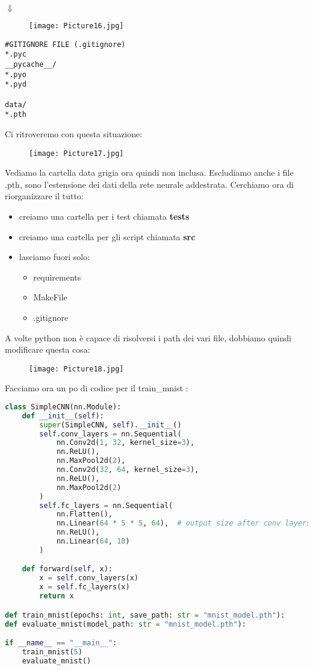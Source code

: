 \documentclass[a4paper,12pt]{article}
\begin{document}
\begin{center}
    $\Downarrow$
\end{center}
\begin{figure}[H]
    \centering
    \texttt{[image: Picture16.jpg]}
    \label{etichetta38}
\end{figure}
\begin{lstlisting}
#GITIGNORE FILE (.gitignore)
*.pyc
__pycache__/
*.pyo 
*.pyd 

data/ 
*.pth 
\end{lstlisting}
Ci ritroveremo con questa situazione: 
\begin{figure}[H]
    \centering
    \texttt{[image: Picture17.jpg]}
    \label{etichetta39}
\end{figure}
\noindent Vediamo la cartella data grigia ora quindi non inclusa. Escludiamo anche i file .pth, sono l'estensione dei dati della rete neurale addestrata. 
\vspace{2em}
Cerchiamo ora di riorganizzare il tutto:
\begin{itemize}
    \item creiamo una cartella per i test chiamata \textbf{tests}
    \item creiamo una cartella per gli script chiamata \textbf{src}
    \item lasciamo fuori solo:
    \begin{itemize}
        \item requirements
        \item MakeFile
        \item .gitignore
    \end{itemize}
\end{itemize}
A volte python non è capace di risolversi i path dei vari file, dobbiamo quindi modificare questa cosa:
\begin{figure}[H]
    \centering
    \texttt{[image: Picture18.jpg]}
    \label{etichetta40}
\end{figure}
\noindent Facciamo ora un po di codice per il train\_mnist :
\begin{lstlisting}[language=Python, basicstyle=\ttfamily\footnotesize, breaklines=true, frame=single]
class SimpleCNN(nn.Module):
    def __init__(self):
        super(SimpleCNN, self).__init__()
        self.conv_layers = nn.Sequential(
            nn.Conv2d(1, 32, kernel_size=3),
            nn.ReLU(),
            nn.MaxPool2d(2),
            nn.Conv2d(32, 64, kernel_size=3),
            nn.ReLU(),
            nn.MaxPool2d(2)
        )
        self.fc_layers = nn.Sequential(
            nn.Flatten(),
            nn.Linear(64 * 5 * 5, 64),  # output size after conv layers is [64,5,5]
            nn.ReLU(),
            nn.Linear(64, 10)
        )

    def forward(self, x):
        x = self.conv_layers(x)
        x = self.fc_layers(x)
        return x

def train_mnist(epochs: int, save_path: str = "mnist_model.pth"):
def evaluate_mnist(model_path: str = "mnist_model.pth"):

if __name__ == "__main__":
    train_mnist(5)
    evaluate_mnist()
\end{lstlisting}
\end{document}
